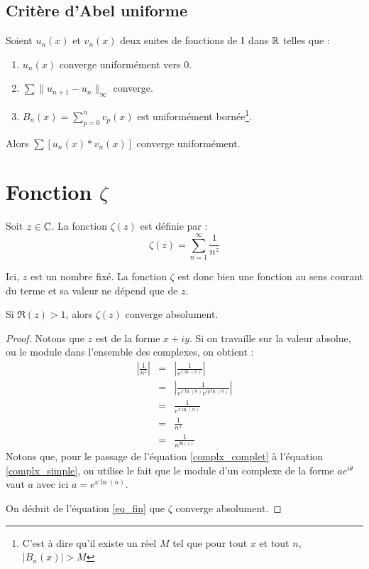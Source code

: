 \subsection{Critère d'Abel uniforme}
\begin{thm}
Soient $u_n(x)$ et $v_n(x)$ deux suites de fonctions de $\text{I}$ dans $\mathbb{R}$ telles que :
\begin{enumerate}
	\item $u_n(x)$ converge uniformément vers 0.
	\item $\sum\|u_{n+1}-u_n\|_\infty$ converge.
	\item $B_n(x)=\sum\limits_{p=0}^nv_p(x)$ est uniformément bornée\footnote{C'est à dire qu'il existe un réel $M$ tel que pour tout $x$ et tout $n$, $|B_n(x)|>M$}.
\end{enumerate}
Alors $\sum\left[u_n(x)*v_n(x)\right]$ converge uniformément.
\end{thm}

\section{Fonction $\zeta$}
\begin{defi}
Soit $z\in\mathbb{C}$. La fonction $\zeta(z)$ est définie par :
$$\zeta(z)=\sum\limits_{n=1}^\infty \frac{1}{n^z}$$
\end{defi}
\begin{note}
Ici, $z$ est un nombre fixé. La fonction $\zeta$ est donc bien une fonction au sens courant du terme et sa valeur ne dépend que de $z$.
\end{note}
\begin{propo}
 Si $\Re(z) > 1$, alors $\zeta(z)$ converge absolument. 
\end{propo}
\begin{proof}
Notons que $z$ est de la forme $x+iy$. Si on travaille sur la valeur absolue, ou le module dans l'ensemble des complexes, on obtient :
\begin{eqnarray}
	\left|\frac{1}{n^z}\right| &=&\left|\frac{1}{e^{z\ln(n)}}\right|\nonumber\\
	&=&\left|\frac{1}{e^{x\ln(n)}e^{iy\ln(n)}}\right|\label{complx_complet}\\
	&=&\frac{1}{e^{x\ln(n)}}\label{complx_simple}\\
	&=&\frac{1}{n^x}\nonumber\\
	&=&\frac{1}{n^{\Re(z)}}\label{eq_fin}
\end{eqnarray}
Notons que, pour le passage de l'équation \eqref{complx_complet} à l'équation \eqref{complx_simple}, on utilise le fait que le module d'un complexe de la forme $ae^{i\theta}$ vaut $a$ avec ici $a=e^{x\ln(n)}$.

On déduit de l'équation \eqref{eq_fin} que $\zeta$ converge absolument.
\end{proof}
